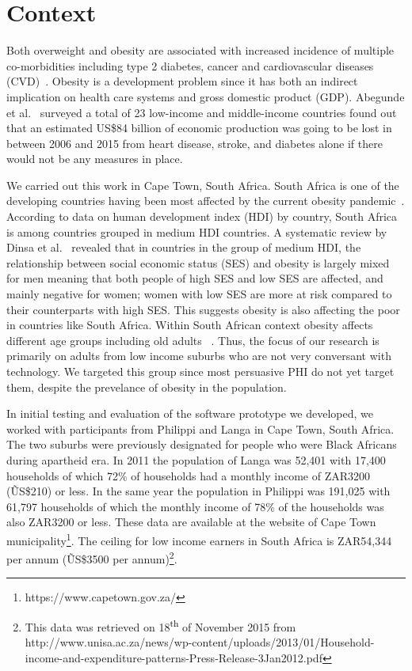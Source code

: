 \documentclass{sig-alternate}
\def\SP#1{\textsuperscript{\textcolor{black}{#1}}}
\begin{document}
\section{Context}

Both overweight and obesity are associated with increased incidence of
multiple co-morbidities including type 2 diabetes, cancer and cardiovascular
diseases (CVD)~\cite{guh2009incidence}. Obesity is a development problem
since it has both an indirect implication on health care systems and gross
domestic product (GDP). Abegunde et al.~\cite{abegunde:theburden} surveyed a
total of 23 low-income and middle-income countries found out that an estimated
US\$84 billion of economic production was going to be lost in between 2006 and
2015 from heart disease, stroke, and diabetes alone if there would not be any
measures in place.

We carried out this work in Cape Town, South Africa. South Africa is one of the
developing countries having been most affected by the current obesity pandemic~\cite{ali2009factors}. According to data on human development index (HDI) by
country, South Africa is among countries grouped in medium HDI countries. A
systematic review by Dinsa et al.~\cite{dinsa2012obesity} revealed that in
countries in the group of medium HDI, the relationship between social economic
status (SES) and obesity is largely mixed for men meaning that both people of
high SES and low SES are affected,  and mainly negative for women;
women with low SES are more at risk compared to their counterparts with high
SES.  This suggests obesity is also affecting the poor in countries like South
Africa. Within South African context obesity affects different age groups
including old adults ~\cite{ali2009factors}. Thus, the focus of our research is
primarily on adults from low income suburbs who are not very conversant with
technology. We targeted this group since most persuasive PHI do not yet 
target them, despite the prevelance of obesity in the population.

In initial testing and evaluation of the software prototype we developed, we
worked with participants from Philippi and Langa in Cape Town, South Africa.
The two suburbs were previously designated for people who were Black Africans
during apartheid era. In 2011 the population of Langa was 52,401 with 17,400
households of which 72\% of households  had a monthly income of ZAR3200
(\~US\$210) or less. In the same year the population in Philippi was 191,025
with 61,797 households of which the monthly income of 78\% of the households
was also ZAR3200 or less. These data are available at the website of Cape Town
municipality\footnote{https://www.capetown.gov.za/}.    The ceiling for low
income earners in South Africa is ZAR54,344 per annum (\~US\$3500 per
annum)\footnote{This data was retrieved on 18\SP{th} of November 2015 from
http://www.unisa.ac.za/news/wp-content/uploads/2013/01/Household-
income-and-expenditure-patterns-Press-Release-3Jan2012.pdf}.
\end{document}
